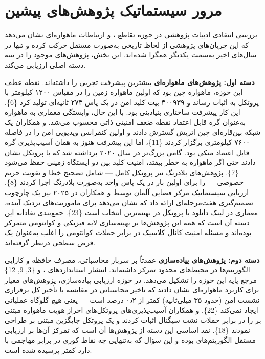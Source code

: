 \documentclass[a4paper,14pt]{extreport}
\begin{document}
\section{مرور سیستماتیک پژوهش‌های پیشین}

بررسی انتقادی ادبیات پژوهشی در حوزه تقاطع ،  و ارتباطات ماهواره‌ای نشان می‌دهد که این جریان‌های پژوهشی از لحاظ تاریخی به‌صورت مستقل حرکت کرده و تنها در سال‌های اخیر به‌سمت یکدیگر همگرا شده‌اند. این بخش، پژوهش‌های موجود را در سه دسته اصلی ارزیابی می‌کند.

\textbf{دسته اول: پژوهش‌های ماهواره‌ای } بیشترین پیشرفت تجربی را داشته‌اند. نقطه عطف این حوزه، ماهواره  چین بود که اولین  ماهواره-زمین را در مقیاس ۱۲۰۰ کیلومتر با پروتکل  به اثبات رساند و ۳۰۰۹۳۹ بیت کلید امن در یک پاس ۲۷۳ ثانیه‌ای تولید کرد \{6\}. این کار پیشرفت ساختاری بنیادینی بود. با این حال، وابستگی معماری  به ماهواره به‌عنوان گره قابل اعتماد  نقطه ضعف امنیتی ذاتی محسوب می‌شد.  و همکاران یک شبکه بین‌قاره‌ای چین-اتریش گسترش دادند و اولین کنفرانس ویدیویی امن را در فاصله ۷۶۰۰ کیلومتری برگزار کردند \{11\}، اما این پیشرفت هنوز به همان آسیب‌پذیری گره قابل اعتماد متکی بود. گامی بزرگ‌تر در سال ۲۰۲۰ برداشته شد که با پروتکل  نشان دادند حتی اگر ماهواره به خطر بیفتد، امنیت کلید بین دو ایستگاه زمینی حفظ می‌شود \{7\}. پژوهش‌های بلادرنگ  نیز پروتکل کامل  --- شامل تصحیح خطا و تقویت حریم خصوصی --- را برای اولین بار در یک پاس واحد به‌صورت بلادرنگ اجرا کردند \{8\}. ارزیابی سیستماتیک مرکز فضایی آلمان  توسط  و همکاران در ۲۰۲۵ نیز یک چارچوب تصمیم‌گیری هفت‌مرحله‌ای ارائه داد که نشان می‌دهد برای مأموریت‌های نزدیک آینده، معماری  در لینک دانلود با پروتکل  در  بهینه‌ترین انتخاب است \{23\}. جمع‌بندی نقادانه این دسته آن است که همه این پژوهش‌ها بر بهینه‌سازی لایه فیزیکی و کوانتومی متمرکز بوده‌اند و مسئله امنیت کانال کلاسیک  در برابر حملات کوانتومی را اغلب به‌عنوان یک فرض سطحی درنظر گرفته‌اند.

\textbf{دسته دوم: پژوهش‌های پیاده‌سازی } عمدتاً بر سربار محاسباتی، مصرف حافظه و کارایی الگوریتم‌ها در محیط‌های محدود تمرکز داشته‌اند. انتشار استانداردهای ،  و  \{3, 9, 12\} مرجع پایه این حوزه را تشکیل می‌دهد. در حوزه ارزیابی پیاده‌سازی، پژوهش‌های معیار برای کاربرد ماهواره‌ای نشان دادند که تأخیر محاسباتی  در مقایسه با تأخیر کل برقراری نشست امن (حدود ۳۵ میلی‌ثانیه) کمتر از ۰٫۲ درصد است --- یعنی هیچ گلوگاه عملیاتی ایجاد نمی‌کند \{22\}.  و همکاران آسیب‌پذیری‌های پروتکل‌های احراز هویت ماهواره  مبتنی بر  را در برابر حملات نشت سیگنال اثبات کردند و یک پروتکل جایگزین مبتنی بر  طراحی نمودند \{18\}. نقد اساسی این دسته از پژوهش‌ها آن است که تمرکز آن‌ها بر ارزیابی مستقل الگوریتم‌های  بوده و این سؤال که  به‌تنهایی چه نقاط کوری در برابر مهاجمی با  دارد کمتر پرسیده شده است.
\end{document}
